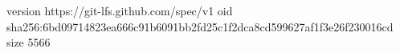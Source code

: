 version https://git-lfs.github.com/spec/v1
oid sha256:6bd09714823ea666c91b6091bb2fd25c1f2dca8cd599627af1f3e26f230016cd
size 5566
